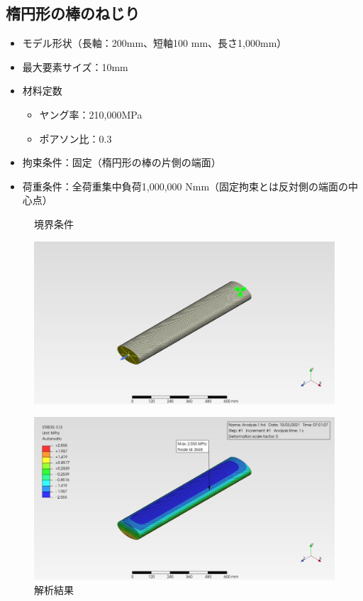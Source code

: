 \documentclass[a4j,20pt,slide]{ltjsarticle}
\begin{document}
\subsection{楕円形の棒のねじり}\label{sec:6.3}
\begin{itemize}
	\item モデル形状（長軸：200mm、短軸100 mm、長さ1,000mm）
	\item 最大要素サイズ：10mm
	\item 材料定数
	      \begin{itemize}
		      \item ヤング率：210,000MPa
		      \item ポアソン比：0.3
	      \end{itemize}
	\item 拘束条件：固定（楕円形の棒の片側の端面）
	\item 荷重条件：全荷重集中負荷1,000,000 Nmm（固定拘束とは反対側の端面の中心点）
\end{itemize}
\vspace{-\baselineskip}
\begin{figure}[H]
	\begin{minipage}{.49\hsize}
		\caption{境界条件}
		\label{03-01}
		\centering
		\includegraphics[width=.95\columnwidth]{fig/03-01.png}
	\end{minipage}
	\begin{minipage}{.49\hsize}
		\caption{解析結果}
		\label{03-02}
		\centering
		\includegraphics[width=.95\columnwidth]{fig/03-02.png}
	\end{minipage}
\end{figure}
\clearpage
%
\end{document}
